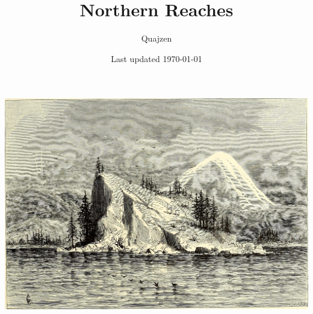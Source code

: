 \documentclass[notitlepage]{article}
\title{Northern Reaches}
\author{Quajzen}
\date{Last updated \today}
\begin{document}
\maketitle
\vfill
\includegraphics[width=\textwidth]{cover}
\newpage
\tableofcontents

\newpage
\end{document}
